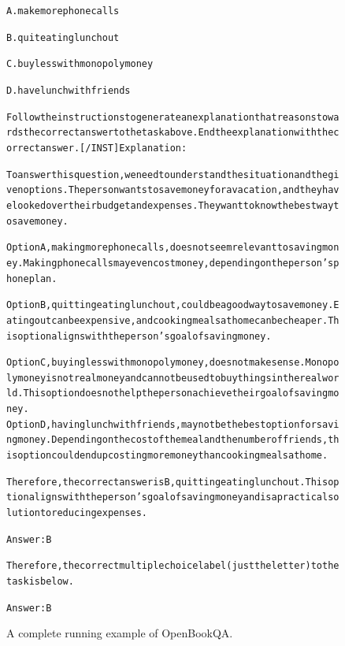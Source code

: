 \begin{figure}[t]
{{\begin{alltt}
A. make more phone calls

B. quit eating lunch out

C. buy less with monopoly money

D. have lunch with friends

Follow the instructions to generate an explanation that reasons towards the correct answer to the task above. End the explanation with the correct answer. [/INST] Explanation: 

To answer this question, we need to understand the situation and the given options. The person wants to save money for a vacation, and they have looked over their budget and expenses. They want to know the best way to save money.

Option A, making more phone calls, does not seem relevant to saving money. Making phone calls may even cost money, depending on the person's phone plan.

Option B, quitting eating lunch out, could be a good way to save money. Eating out can be expensive, and cooking meals at home can be cheaper. This option aligns with the person's goal of saving money.

Option C, buying less with monopoly money, does not make sense. Monopoly money is not real money and cannot be used to buy things in the real world. This option does not help the person achieve their goal of saving money.
Option D, having lunch with friends, may not be the best option for saving money. Depending on the cost of the meal and the number of friends, this option could end up costing more money than cooking meals at home.

Therefore, the correct answer is B, quitting eating lunch out. This option aligns with the person's goal of saving money and is a practical solution to reducing expenses.

Answer: B

Therefore, the correct multiple choice label (just the letter) to the task is below.

Answer: B
\end{alltt}
}}
\caption{A complete running example of OpenBookQA.}
\label{fig:commonsense_dataset=openbookqa_example}
\end{figure}
